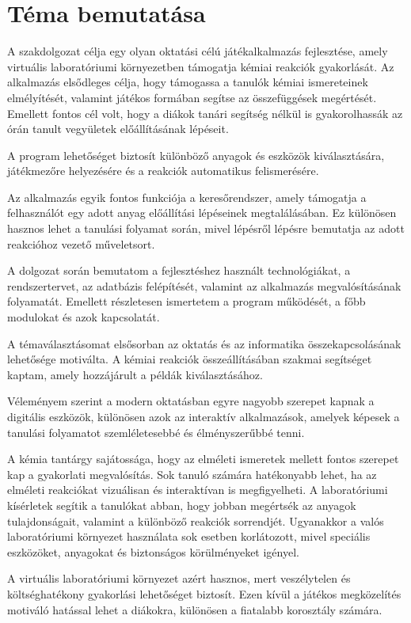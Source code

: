 \documentclass[]{thesis-ekf}
\begin{document}
	\section{Téma bemutatása}
	
	A szakdolgozat célja egy olyan oktatási célú játékalkalmazás fejlesztése, amely virtuális laboratóriumi	környezetben támogatja kémiai reakciók gyakorlását.
	Az alkalmazás elsődleges célja, hogy támogassa a tanulók kémiai ismereteinek elmélyítését, valamint játékos formában segítse az összefüggések megértését. Emellett fontos cél volt, hogy a diákok tanári segítség nélkül is gyakorolhassák az órán tanult vegyületek előállításának lépéseit.
	
	A program lehetőséget biztosít különböző anyagok és eszközök kiválasztására, játékmezőre helyezésére	és a reakciók automatikus felismerésére.
	
	Az alkalmazás egyik fontos funkciója a keresőrendszer, amely támogatja a felhasználót egy adott anyag	előállítási lépéseinek megtalálásában. Ez különösen hasznos lehet a tanulási folyamat során, mivel lépésről lépésre bemutatja az adott reakcióhoz vezető műveletsort.
	
	A dolgozat során bemutatom a fejlesztéshez használt technológiákat, a rendszertervet, az adatbázis felépítését, valamint az alkalmazás megvalósításának folyamatát. Emellett részletesen ismertetem a program működését, a főbb modulokat és azok kapcsolatát.
	
	A témaválasztásomat elsősorban az oktatás és az informatika összekapcsolásának lehetősége motiválta. A kémiai reakciók összeállításában szakmai segítséget kaptam, amely hozzájárult a példák kiválasztásához.
	
	Véleményem szerint a modern oktatásban egyre nagyobb szerepet kapnak a digitális eszközök, különösen azok az interaktív alkalmazások, amelyek képesek a tanulási folyamatot szemléletesebbé és élményszerűbbé tenni.
	
	A kémia tantárgy sajátossága, hogy az elméleti ismeretek mellett fontos szerepet kap a gyakorlati megvalósítás. Sok tanuló számára hatékonyabb lehet, ha az elméleti reakciókat vizuálisan és interaktívan is megfigyelheti. A laboratóriumi kísérletek segítik a tanulókat abban, hogy jobban megértsék az anyagok tulajdonságait, valamint a különböző reakciók sorrendjét. Ugyanakkor a valós laboratóriumi környezet használata sok esetben korlátozott, mivel speciális eszközöket, anyagokat és biztonságos körülményeket igényel.
	
	A virtuális laboratóriumi környezet azért hasznos, mert veszélytelen és költséghatékony gyakorlási lehetőséget biztosít. Ezen kívül a játékos megközelítés motiváló hatással lehet a diákokra, különösen a fiatalabb korosztály számára.
	
\end{document}
